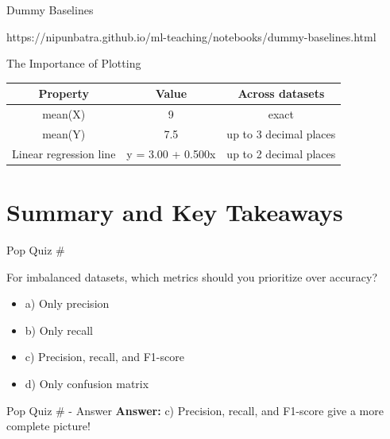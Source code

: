\documentclass[usenames,dvipsnames]{beamer}
\begin{document}
  \begin{frame}{Dummy Baselines}
	\begin{notebookbox}{https://nipunbatra.github.io/ml-teaching/notebooks/dummy-baselines.html}
	  \end{notebookbox}
\end{frame}

\begin{frame}{The Importance of Plotting}
\begin{tabular}{|c|c|c|}
\hline 
Property & Value & Across datasets \\ 
\hline 
mean(X) & 9 & exact \\ 
mean(Y) & 7.5 & up to 3 decimal places \\ 
Linear regression line & 	y = 3.00 + 0.500x & up to 2 decimal places \\ 
\hline 
\end{tabular} 


\end{frame}

\section{Summary and Key Takeaways}

\begin{frame}{Pop Quiz \#\thepopquiz}
\begin{popquizbox}{\thepopquiz}
For imbalanced datasets, which metrics should you prioritize over accuracy?
\begin{itemize}
	\item a) Only precision
	\item b) Only recall
	\item c) Precision, recall, and F1-score
	\item d) Only confusion matrix
\end{itemize}
\end{popquizbox}
\end{frame}

\begin{frame}{Pop Quiz \#\thepopquiz{} - Answer}
\textbf{Answer:} c) Precision, recall, and F1-score give a more complete picture!
\end{frame}
\end{document}
